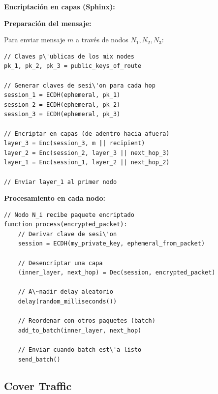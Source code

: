 \documentclass[11pt,a4paper,twoside]{book}
\begin{document}
\begin{mathnote}
\textbf{Encriptaci\'on en capas (Sphinx):}

\textbf{Preparaci\'on del mensaje:}

Para enviar mensaje $m$ a trav\'es de nodos $N_1, N_2, N_3$:

\begin{verbatim}
// Claves p\'ublicas de los mix nodes
pk_1, pk_2, pk_3 = public_keys_of_route

// Generar claves de sesi\'on para cada hop
session_1 = ECDH(ephemeral, pk_1)
session_2 = ECDH(ephemeral, pk_2)
session_3 = ECDH(ephemeral, pk_3)

// Encriptar en capas (de adentro hacia afuera)
layer_3 = Enc(session_3, m || recipient)
layer_2 = Enc(session_2, layer_3 || next_hop_3)
layer_1 = Enc(session_1, layer_2 || next_hop_2)

// Enviar layer_1 al primer nodo
\end{verbatim}

\textbf{Procesamiento en cada nodo:}

\begin{verbatim}
// Nodo N_i recibe paquete encriptado
function process(encrypted_packet):
    // Derivar clave de sesi\'on
    session = ECDH(my_private_key, ephemeral_from_packet)
    
    // Desencriptar una capa
    (inner_layer, next_hop) = Dec(session, encrypted_packet)
    
    // A\~nadir delay aleatorio
    delay(random_milliseconds())
    
    // Reordenar con otros paquetes (batch)
    add_to_batch(inner_layer, next_hop)
    
    // Enviar cuando batch est\'a listo
    send_batch()
\end{verbatim}
\end{mathnote}

\subsection{Cover Traffic}
\end{document}
